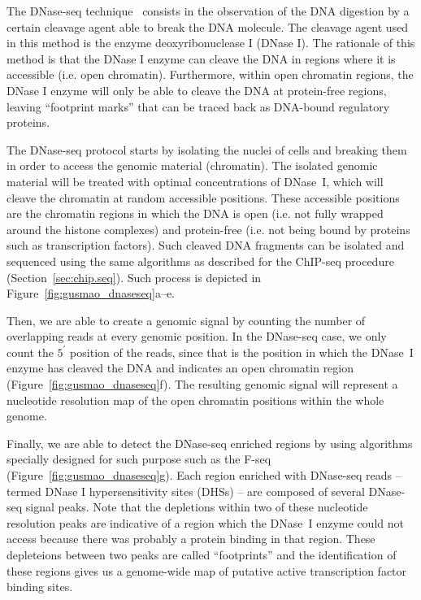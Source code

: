 The DNase-seq technique~\cite{crawford2004,sabo2004a} consists in the observation of the DNA digestion by a certain cleavage agent able to break the DNA molecule. The cleavage agent used in this method is the enzyme deoxyribonuclease I (DNase I). The rationale of this method is that the DNase I enzyme can cleave the DNA in regions where it is accessible (i.e. open chromatin). Furthermore, within open chromatin regions, the DNase I enzyme will only be able to cleave the DNA at protein-free regions, leaving ``footprint marks'' that can be traced back as DNA-bound regulatory proteins.

The DNase-seq protocol starts by isolating the nuclei of cells and breaking them in order to access the genomic material (chromatin). The isolated genomic material will be treated with optimal concentrations of DNase~I, which will cleave the chromatin at random accessible positions. These accessible positions are the chromatin regions in which the DNA is open (i.e. not fully wrapped around the histone complexes) and protein-free (i.e. not being bound by proteins such as transcription factors). Such cleaved DNA fragments can be isolated and sequenced using the same algorithms as described for the ChIP-seq procedure (Section~\ref{sec:chip.seq}). Such process is depicted in Figure~\ref{fig:gusmao_dnaseseq}a--e.

Then, we are able to create a genomic signal by counting the number of overlapping reads at every genomic position. In the DNase-seq case, we only count the $5^{\prime}$ position of the reads, since that is the position in which the DNase~I enzyme has cleaved the DNA and indicates an open chromatin region (Figure~\ref{fig:gusmao_dnaseseq}f). The resulting genomic signal will represent a nucleotide resolution map of the open chromatin positions within the whole genome.

Finally, we are able to detect the DNase-seq enriched regions by using algorithms specially designed for such purpose such as the F-seq~\cite{boyle2008b} (Figure~\ref{fig:gusmao_dnaseseq}g). Each region enriched with DNase-seq reads -- termed DNase I hypersensitivity sites (DHSs) -- are composed of several DNase-seq signal peaks. Note that the depletions within two of these nucleotide resolution peaks are indicative of a region which the DNase~I enzyme could not access because there was probably a protein binding in that region. These depleteions between two peaks are called ``footprints'' and the identification of these regions gives us a genome-wide map of putative active transcription factor binding sites.

